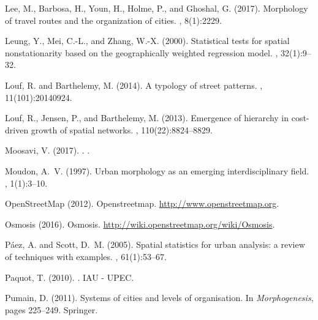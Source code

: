 \documentclass[11pt]{article}
\begin{document}
\begin{multicols}{2}
\begin{thebibliography}{}
Lee, M., Barbosa, H., Youn, H., Holme, P., and Ghoshal, G. (2017).
\newblock Morphology of travel routes and the organization of cities.
, 8(1):2229.

Leung, Y., Mei, C.-L., and Zhang, W.-X. (2000).
\newblock Statistical tests for spatial nonstationarity based on the
  geographically weighted regression model.
, 32(1):9--32.

Louf, R. and Barthelemy, M. (2014).
\newblock A typology of street patterns.
, 11(101):20140924.

Louf, R., Jensen, P., and Barthelemy, M. (2013).
\newblock Emergence of hierarchy in cost-driven growth of spatial networks.
,
  110(22):8824--8829.

{Moosavi}, V. (2017).
.
.

Moudon, A.~V. (1997).
\newblock Urban morphology as an emerging interdisciplinary field.
, 1(1):3--10.

OpenStreetMap (2012).
\newblock Openstreetmap.
\newblock \url{http://www.openstreetmap.org}.

Osmosis (2016).
\newblock Osmosis.
\newblock \url{http://wiki.openstreetmap.org/wiki/Osmosis}.

P{\'a}ez, A. and Scott, D.~M. (2005).
\newblock Spatial statistics for urban analysis: a review of techniques with
  examples.
, 61(1):53--67.

Paquot, T. (2010).
.
\newblock IAU - UPEC.

Pumain, D. (2011).
\newblock Systems of cities and levels of organisation.
\newblock In {\em Morphogenesis}, pages 225--249. Springer.


\end{thebibliography}
\end{multicols}
\end{document}
